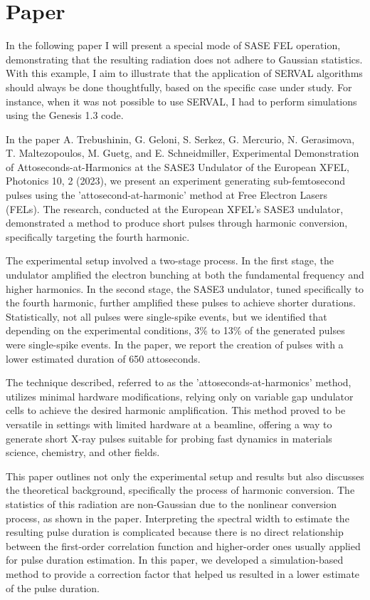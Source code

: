 


\newpage    
\setcounter{mycounter}{4} %
\section{Paper }
    In the following paper I will present a special mode of SASE FEL operation, demonstrating that the resulting radiation does not adhere to Gaussian statistics. With this example, I aim to illustrate that the application of SERVAL algorithms should always be done thoughtfully, based on the specific case under study. For instance, when it was not possible to use SERVAL, I had to perform simulations using the Genesis 1.3 code.
    
    In the paper A. Trebushinin, G. Geloni, S. Serkez, G. Mercurio, N. Gerasimova, T. Maltezopoulos, M. Guetg, and E. Schneidmiller, Experimental Demonstration of Attoseconds-at-Harmonics at the SASE3 Undulator of the European XFEL, Photonics 10, 2 (2023), we present an experiment generating sub-femtosecond pulses using the 'attosecond-at-harmonic' method at Free Electron Lasers (FELs). The research, conducted at the European XFEL's SASE3 undulator, demonstrated a method to produce short pulses through harmonic conversion, specifically targeting the fourth harmonic.

    The experimental setup involved a two-stage process. In the first stage, the undulator amplified the electron bunching at both the fundamental frequency and higher harmonics. In the second stage, the SASE3 undulator, tuned specifically to the fourth harmonic, further amplified these pulses to achieve shorter durations. Statistically, not all pulses were single-spike events, but we identified that depending on the experimental conditions, 3\% to 13\% of the generated pulses were single-spike events. In the paper, we report the creation of pulses with a lower estimated duration of 650 attoseconds.
    
    The technique described, referred to as the 'attoseconds-at-harmonics' method, utilizes minimal hardware modifications, relying only on variable gap undulator cells to achieve the desired harmonic amplification. This method proved to be versatile in settings with limited hardware at a beamline, offering a way to generate short X-ray pulses suitable for probing fast dynamics in materials science, chemistry, and other fields.
    
    This paper outlines not only the experimental setup and results but also discusses the theoretical background, specifically the process of harmonic conversion. The statistics of this radiation are non-Gaussian due to the nonlinear conversion process, as shown in the paper. Interpreting the spectral width to estimate the resulting pulse duration is complicated because there is no direct relationship between the first-order correlation function and higher-order ones usually applied for pulse duration estimation. In this paper, we developed a simulation-based method to provide a correction factor that helped us resulted in a lower estimate of the pulse duration.
    
